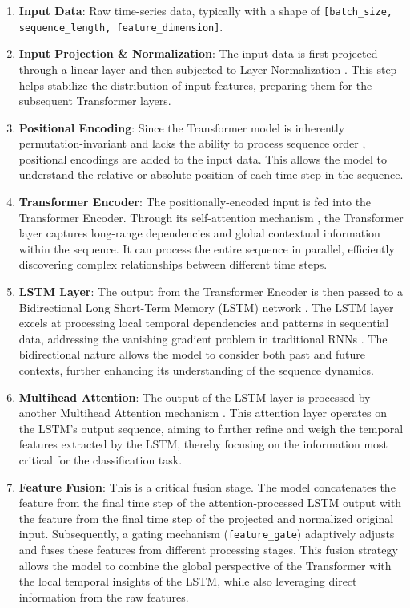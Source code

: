 \begin{enumerate}
    \item \textbf{Input Data}: Raw time-series data, typically with a shape of \texttt{[batch\_size, sequence\_length, feature\_dimension]}.
    \item \textbf{Input Projection \& Normalization}: The input data is first projected through a linear layer and then subjected to Layer Normalization \citep{ba2016layer}. This step helps stabilize the distribution of input features, preparing them for the subsequent Transformer layers.
    \item \textbf{Positional Encoding}: Since the Transformer model is inherently permutation-invariant and lacks the ability to process sequence order \citep{vaswani2017attention}, positional encodings are added to the input data. This allows the model to understand the relative or absolute position of each time step in the sequence.
    \item \textbf{Transformer Encoder}: The positionally-encoded input is fed into the Transformer Encoder. Through its self-attention mechanism \citep{bahdanau2015neural, vaswani2017attention}, the Transformer layer captures long-range dependencies and global contextual information within the sequence. It can process the entire sequence in parallel, efficiently discovering complex relationships between different time steps.
    \item \textbf{LSTM Layer}: The output from the Transformer Encoder is then passed to a Bidirectional Long Short-Term Memory (LSTM) network \citep{hochreiter1997long}. The LSTM layer excels at processing local temporal dependencies and patterns in sequential data, addressing the vanishing gradient problem in traditional RNNs \citep{pascanu2013difficulty}. The bidirectional nature allows the model to consider both past and future contexts, further enhancing its understanding of the sequence dynamics.
    \item \textbf{Multihead Attention}: The output of the LSTM layer is processed by another Multihead Attention mechanism \citep{vaswani2017attention}. This attention layer operates on the LSTM's output sequence, aiming to further refine and weigh the temporal features extracted by the LSTM, thereby focusing on the information most critical for the classification task.
    \item \textbf{Feature Fusion}: This is a critical fusion stage. The model concatenates the feature from the final time step of the attention-processed LSTM output with the feature from the final time step of the projected and normalized original input. Subsequently, a gating mechanism (\texttt{feature\_gate}) adaptively adjusts and fuses these features from different processing stages. This fusion strategy allows the model to combine the global perspective of the Transformer with the local temporal insights of the LSTM, while also leveraging direct information from the raw features.

\end{enumerate}
